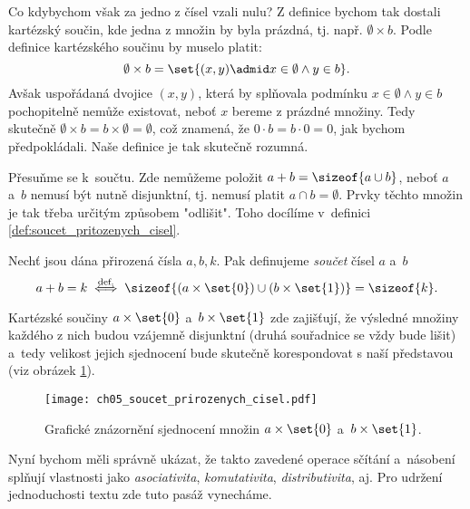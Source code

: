 Co kdybychom však za jedno z čísel vzali nulu? Z definice bychom tak dostali kartézský součin, kde jedna z množin by byla prázdná, tj. např. $\emptyset\times b$. Podle definice kartézského součinu by muselo platit:
\begin{equation*}
    \emptyset\times b=\set{(x,y) \admid x\in\emptyset \land y\in b}.
\end{equation*}
Avšak uspořádaná dvojice $(x,y)$, která by splňovala podmínku $x\in\emptyset \land y\in b$ pochopitelně nemůže existovat, neboť $x$ bereme z prázdné množiny. Tedy skutečně $\emptyset\times b=b\times\emptyset=\emptyset$, což znamená, že $0\cdot b=b\cdot 0=0$, jak bychom předpokládali. Naše definice je tak skutečně rozumná.\par
Přesuňme se k~součtu. Zde nemůžeme položit $a+b=\sizeof{a\cup b}$, neboť $a$ a~$b$ nemusí být nutně disjunktní, tj. nemusí platit $a\cap b=\emptyset$. Prvky těchto množin je tak třeba určitým způsobem "odlišit". Toho docílíme v~definici \ref{def:soucet_pritozenych_cisel}.
\begin{definition}\label{def:soucet_pritozenych_cisel}
    Nechť jsou dána přirozená čísla $a,b,k$. Pak definujeme \emph{součet} čísel $a$ a~$b$
    \begin{equation*}
        a+b=k\stackrel{\text{def.}}{\iff} \sizeof{(a\times\set{0})\cup (b\times\set{1})}=\sizeof{k}.
    \end{equation*}
\end{definition}
Kartézské součiny $a\times\set{0}$ a~$b\times\set{1}$ zde zajišťují, že výsledné množiny každého z nich budou vzájemně disjunktní (druhá souřadnice se vždy bude lišit) a~tedy velikost jejich sjednocení bude skutečně korespondovat s naší představou (viz obrázek \ref{fig:soucet_prirozenych_cisel}).
\begin{figure}[H]
	\centering
	\texttt{[image: ch05\_soucet\_prirozenych\_cisel.pdf]}
    \caption{Grafické znázornění sjednocení množin $a\times\set{0}$ a~$b\times\set{1}$.}
    \label{fig:soucet_prirozenych_cisel}
\end{figure}
Nyní bychom měli správně ukázat, že takto zavedené operace sčítání a~násobení splňují vlastnosti jako \emph{asociativita}, \emph{komutativita}, \emph{distributivita}, aj. Pro udržení jednoduchosti textu zde tuto pasáž vynecháme.